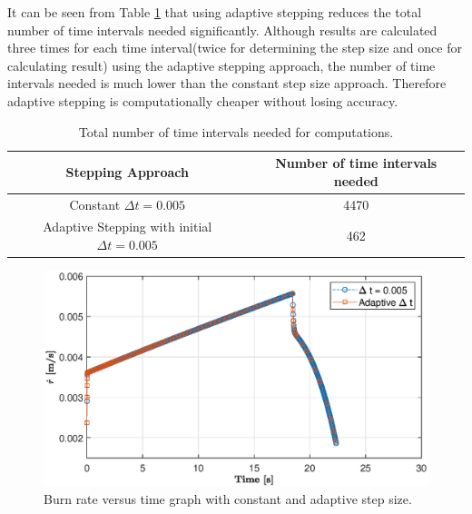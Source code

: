 \documentclass[letterpaper,12pt]{article}
\begin{document}
It can be seen from Table \ref{tbl:timeint} that using adaptive stepping reduces the total number of time intervals needed significantly.
Although results are calculated three times for each time interval(twice for determining the step size and once for calculating result) 
using the adaptive stepping approach, the number of time intervals needed is much lower than the constant step size approach. Therefore adaptive stepping is 
computationally cheaper without losing accuracy. 


\begin{table}[!h]
	\begin{center}
	\caption{Total number of time intervals needed for computations.}
	\vspace{1em}
	\label{tbl:timeint}
	\begin{tabular}{|c|c|} 
	\hline
	\multicolumn{1}{|c|}{\bf{Stepping Approach}} & \multicolumn{1}{c|}{\bf{Number of time intervals needed}} \\
	\hline
	Constant $\Delta t = 0.005$ &   4470 \\ \hline
	Adaptive Stepping with initial $\Delta t = 0.005$ &   462 \\ \hline
	\end{tabular}
	\end{center}
\end{table}


\newpage

\begin{figure}[!h]
	\centering
	\includegraphics[height = 8.5 cm]{graphs/bonus_rdot.eps}
	\caption{Burn rate versus time graph with constant and adaptive step size.}
	\label{fig:bonus_rdot}
\end{figure}
\end{document}
